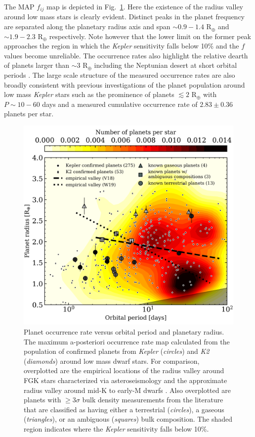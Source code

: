 \documentclass[twocolumn]{emulateapj}
\newcommand{\kepler}[1]{\emph{Kepler}#1}
\newcommand{\ktwo}[1]{\emph{K2}#1}
\begin{document}
The MAP $f_{ij}$ map is depicted in Fig.~\ref{fig:fmap}.
Here the existence of the radius valley around low mass stars is clearly
evident. Distinct peaks in the planet frequency are separated along the planetary radius axis and span
$\sim 0.9-1.4$ R$_{\oplus}$ and $\sim 1.9-2.3$ R$_{\oplus}$ respectively.
Note however that the lower limit on the former peak 
approaches the region in which the \kepler{} sensitivity falls below 10\% and the $f$ values become
unreliable.
The occurrence rates also highlight the relative dearth of planets larger than $\sim 3$ R$_{\oplus}$
including the Neptunian desert at short orbital periods \citep{lundkvist16,mazeh16}. The large scale
structure of the measured occurrence rates are also broadly consistent with previous investigations
of the planet population around low mass \kepler{} stars \citep{morton14,dressing15a,gaidos16} such
as the prominence of planets $\lesssim 2$ R$_{\oplus}$ with $P \sim 10-60$ days and a measured cumulative
occurrence rate of $2.83\pm 0.36$ planets per star.

\begin{figure}
  \centering
  \includegraphics[width=.8\hsize]{figures/fmap_Msgt0d0_xbin39_ybin26.png}
  \caption{Planet occurrence rate versus orbital period and planetary radius. The maximum a-posteriori occurrence
    rate map calculated from the population of confirmed planets from \kepler{} (\emph{circles}) and
    \ktwo{} (\emph{diamonds}) around low mass dwarf
    stars. For comparison, overplotted are the empirical locations of the radius valley around FGK stars 
    characterized via asteroseismology \citep[\emph{dashed line},][]{vaneylen18} and the approximate radius
    valley around mid-K to early-M dwarfs \citep[\emph{dotted line},][]{wu19}. Also overplotted are planets
    with $\geq 3\sigma$ bulk density measurements from the literature that are classified as having either
    a terrestrial (\emph{circles}), a gaseous (\emph{triangles}), or an ambiguous (\emph{squares}) bulk
    composition. The shaded region indicates where the \kepler{} sensitivity falls below 10\%.} 
  \label{fig:fmap}
\end{figure}
\end{document}
